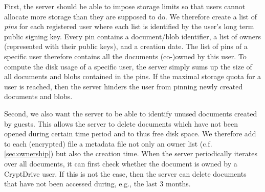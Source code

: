 First, the server should be able to impose storage limits so that users cannot allocate more storage than they are supposed to do.
We therefore create a list of \textit{pins} for each registered user where each list is identified by the user's long term public signing key.
Every pin contains a document/blob identifier, a list of owners (represented with their public keys), and a creation date.
The list of pins of a specific user therefore contains all the documents (co-)owned by this user.
To compute the disk usage of a specific user, the server simply sums up the size of all documents and blobs contained in the pins.
If the maximal storage quota for a user is reached, then the server hinders the user from pinning newly created documents and blobs.

Second, we also want the server to be able to identify unused documents created by guests.
This allows the server to delete documents which have not been opened during certain time period and to thus free disk space.
We therefore add to each (encrypted) file a metadata file not only an owner list (c.f. \cref{sec:ownership}) but also the creation time.
When the server periodically iterates over all documents, it can first check whether the document is owned by a CryptDrive user.
If this is not the case, then the server can delete documents that have not been accessed during, e.g., the last 3 months.
